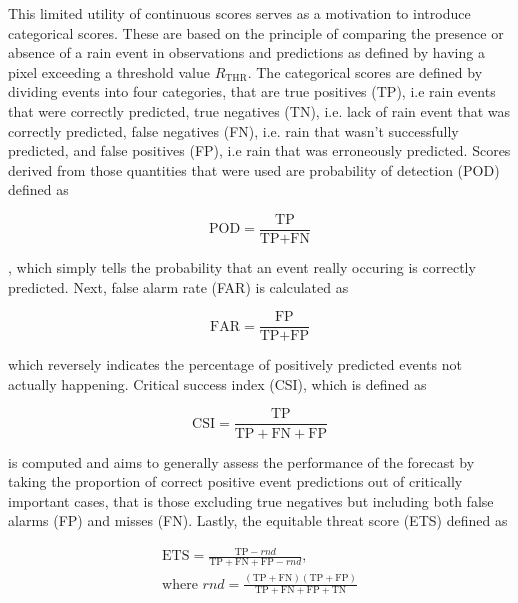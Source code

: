 
This limited utility of continuous scores serves as a motivation to introduce categorical scores. These are based on the principle of comparing the presence or absence of a rain event in observations and predictions as defined by having a pixel exceeding a threshold value $R_{\text{THR}}$. The categorical scores are defined by dividing events into four categories, that are true positives (TP), i.e rain events that were correctly predicted, true negatives (TN), i.e. lack of rain event that was correctly predicted, false negatives (FN), i.e. rain that wasn't successfully predicted, and false positives (FP), i.e rain that was erroneously predicted. Scores derived from those quantities that were used are probability of detection (POD) defined as

\begin{equation}
	\text{POD} = \frac{\text{TP}}{\text{TP}+\text{FN}}
\end{equation} 

, which simply tells the probability that an event really occuring is correctly predicted. Next, false alarm rate (FAR) is calculated as 

\begin{equation}
	\text{FAR} = \frac{\text{FP}}{\text{TP}+\text{FP}}
\end{equation}

which reversely indicates the percentage of positively predicted events not actually happening. Critical success index (CSI), which is defined as 

\begin{equation}
	\text{CSI} = \frac{\text{TP}}{\text{TP}+\text{FN}+\text{FP}}
\end{equation}

is computed and aims to generally assess the performance of the forecast by taking the proportion of correct positive event predictions out of critically important cases, that is those excluding true negatives but including both false alarms (FP) and misses (FN). Lastly, the equitable threat score (ETS) defined as  

\begin{equation}
\begin{split}
\text{ETS} = \frac{\text{TP} - rnd}{\text{TP}+\text{FN}+\text{FP}- rnd}, \\
\text{where } rnd = \frac{(\text{TP}+\text{FN})(\text{TP}+\text{FP})}{\text{TP}+\text{FN}+\text{FP}+\text{TN}}
\end{split}
\end{equation}

